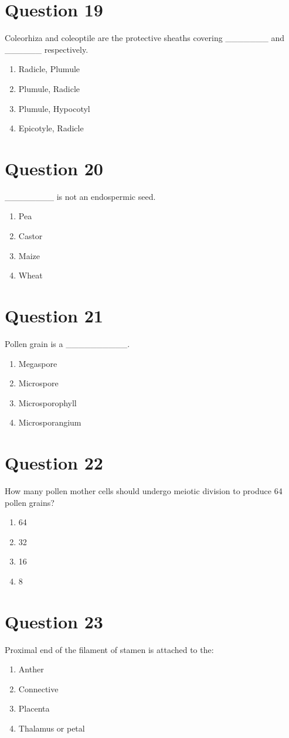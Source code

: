 \documentclass{article}
\begin{document}
\section*{Question 19}
Coleorhiza and coleoptile are the protective sheaths covering _______ and ______ respectively.
\begin{enumerate}[label=(\alph*)]
\item Radicle, Plumule
\item Plumule, Radicle
\item Plumule, Hypocotyl
\item Epicotyle, Radicle
\end{enumerate}
\newpage
\section*{Question 20}
________ is not an endospermic seed.
\begin{enumerate}[label=(\alph*)]
\item Pea
\item Castor
\item Maize
\item Wheat
\end{enumerate}
\newpage
\section*{Question 21}
Pollen grain is a __________.
\begin{enumerate}[label=(\alph*)]
\item Megaspore
\item Microspore
\item Microsporophyll
\item Microsporangium
\end{enumerate}
\newpage
\section*{Question 22}
How many pollen mother cells should undergo meiotic division to produce 64 pollen grains?
\begin{enumerate}[label=(\alph*)]
\item 64
\item 32
\item 16
\item 8
\end{enumerate}
\newpage
\section*{Question 23}
Proximal end of the filament of stamen is attached to the:
\begin{enumerate}[label=(\alph*)]
\item Anther
\item Connective
\item Placenta
\item Thalamus or petal
\end{enumerate}
\newpage
\end{document}
